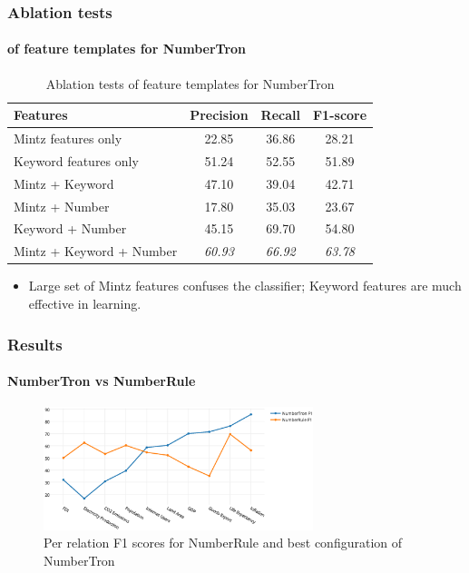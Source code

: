 \documentclass{beamer}
\begin{document}
\begin{frame}
\frametitle{Ablation tests}
\framesubtitle{of feature templates for NumberTron}

\begin{table}
\begin{tabular}{|l|c|c|c|}
\hline
Features & Precision & Recall & F1-score \\
\hline
\hline
Mintz features only & 22.85 & 36.86 & 28.21 \\
\hline
Keyword features only & 51.24 & 52.55 & 51.89 \\
\hline
Mintz + Keyword & 47.10 & 39.04 & 42.71\\
\hline
Mintz + Number & 17.80 & 35.03 & 23.67 \\
\hline
Keyword + Number & 45.15 & 69.70 & 54.80\\
\hline
Mintz + Keyword + Number & \emph{60.93} & \emph{66.92} & \emph{63.78}\\
\hline
\end{tabular}
\caption{Ablation tests of feature templates for NumberTron}
\label{tab:ablationtests}
\end{table}

\begin{itemize}
\item Large set of Mintz features confuses the classifier; Keyword features are much effective in learning.
\end{itemize}


\end{frame}
\begin{frame}
\frametitle{Results}
\framesubtitle{NumberTron vs NumberRule}

\begin{figure}
\includegraphics[width=0.7\textwidth]{images/per_relation.eps}
\caption{Per relation F1 scores for NumberRule and best configuration of NumberTron}
\label{tab:perrelscore}
\end{figure}

\end{frame}
\end{document}
